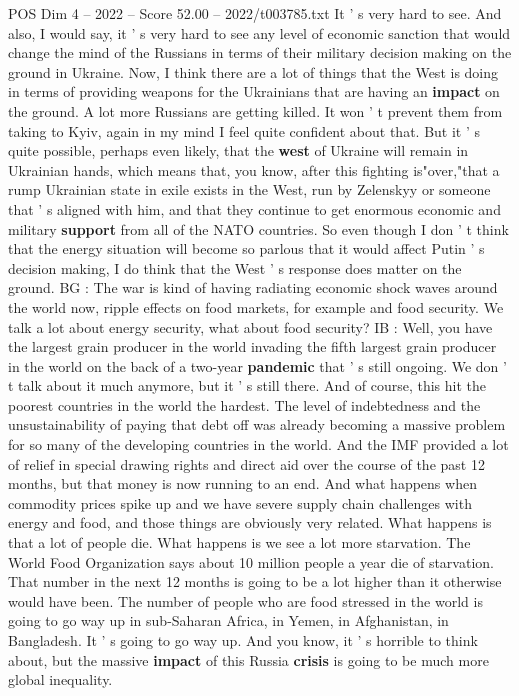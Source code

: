 \begin{textsample}{POS Dim 4 – 2022 – Score 52.00 – 2022/t003785.txt}
It ' s very hard to see.
And also, I would say, it ' s very hard to see any level of economic sanction that would change the mind of the Russians in terms of their military decision making on the ground in Ukraine.
Now, I think there are a lot of things that the West is doing in terms of providing weapons for the Ukrainians that are having an \textbf{impact} on the ground.
A lot more Russians are getting killed.
It won ' t prevent them from taking to Kyiv, again in my mind I feel quite confident about that.
But it ' s quite possible, perhaps even likely, that the \textbf{west} of Ukraine will remain in Ukrainian hands, which means that, you know, after this fighting is"over,"that a rump Ukrainian state in exile exists in the West, run by Zelenskyy or someone that ' s aligned with him, and that they continue to get enormous economic and military \textbf{support} from all of the NATO countries.
So even though I don ' t think that the energy situation will become so parlous that it would affect Putin ' s decision making, I do think that the West ' s response does matter on the ground.
BG : The war is kind of having radiating economic shock waves around the world now, ripple effects on food markets, for example and food security.
We talk a lot about energy security, what about food security?
IB : Well, you have the largest grain producer in the world invading the fifth largest grain producer in the world on the back of a two-year \textbf{pandemic} that ' s still ongoing.
We don ' t talk about it much anymore, but it ' s still there.
And of course, this hit the poorest countries in the world the hardest.
The level of indebtedness and the unsustainability of paying that debt off was already becoming a massive problem for so many of the developing countries in the world.
And the IMF provided a lot of relief in special drawing rights and direct aid over the course of the past 12 months, but that money is now running to an end.
And what happens when commodity prices spike up and we have severe supply chain challenges with energy and food, and those things are obviously very related.
What happens is that a lot of people die.
What happens is we see a lot more starvation.
The World Food Organization says about 10 million people a year die of starvation.
That number in the next 12 months is going to be a lot higher than it otherwise would have been.
The number of people who are food stressed in the world is going to go way up in sub-Saharan Africa, in Yemen, in Afghanistan, in Bangladesh.
It ' s going to go way up.
And you know, it ' s horrible to think about, but the massive \textbf{impact} of this Russia \textbf{crisis} is going to be much more global inequality.

\end{textsample}
